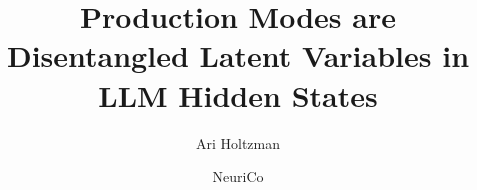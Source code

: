 \documentclass{article}
\title{Production Modes are Disentangled Latent Variables in LLM Hidden States}
\author{%
  Ari Holtzman \and NeuriCo
}
\begin{document}
\maketitle

\begin{abstract}

\end{abstract}









\end{document}
